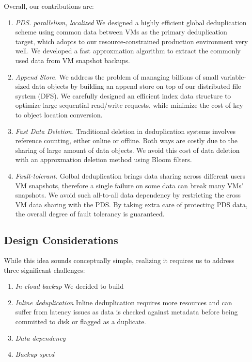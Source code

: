 Overall, our contributions are:
\begin{enumerate}
\item {\em PDS. parallelism, localized}
We designed a highly efficient global deduplication scheme using common data between VMs as the primary
deduplication target, which adopts to our resource-constrained production environment very well. We developed a fast
approxmation algorithm to extract the commonly used data from VM snapshot backups.

\item {\em Append Store.}
We address the problem of managing billions of small variable-sized data objects by building an append store
on top of our distributed file system (DFS). We carefully designed an efficient index data structure to 
optimize large sequential read/write requests, while minimize the cost of key to object location conversion.

\item {\em Fast Data Deletion.}
Traditional deletion in deduplication systems involves reference counting, either online or offline. Both ways
are costly due to the sharing of large amount of data objects.
We avoid this cost of data deletion with an approxmation deletion method using Bloom filters.

\item {\em Fault-tolerant.}
Golbal deduplication brings data sharing across different users VM snapshots, therefore a single failure
on some data can break many VMs' snapshots. We avoid such all-to-all data dependency by restricting
the cross VM data sharing with the PDS. By taking extra care of protecting PDS data, 
the overall degree of fault tolerancy is guaranteed.

\end{enumerate}

\subsection{Design Considerations}
While this idea sounds conceptually simple, realizing it requires us to address three
significant challenges:
\begin{enumerate}
\item {\em In-cloud backup}
We decided to build 
\item {\em Inline deduplication}
Inline deduplication requires more resources and can suffer from latency issues as data is checked against metadata before being committed to disk or flagged as a duplicate.
\item {\em Data dependency}

\item {\em Backup speed}

\end{enumerate}

